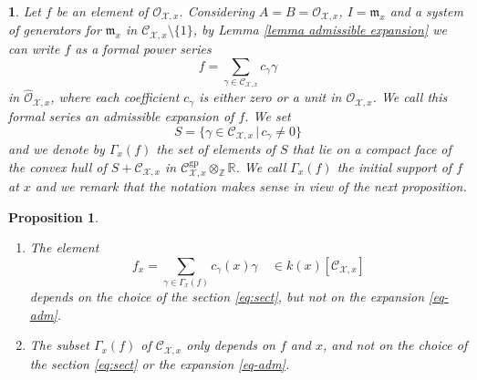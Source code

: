\documentclass{amsart}%
\numberwithin{equation}{subsection}
\theoremstyle{plain2}
\newtheorem{prop}[equation]{Proposition}
\theoremstyle{definition2}
\theoremstyle{stepstyle}
\theoremstyle{point}
\theoremstyle{subpoint}
\newtheorem{subpoint}[equation]{}%
\newcommand{\spa}[1]{\begin{subpoint}#1\end{subpoint}}           %
\newcommand{\Z}{\ensuremath{\mathbb{Z}}}
\newcommand{\R}{\ensuremath{\mathbb{R}}}
\newcommand{\cX}{\ensuremath{\mathscr{X}}}
\newcommand{\caC}{\ensuremath{\mathcal{C}}}
\newcommand{\caO}{\ensuremath{\mathcal{O}}}
\renewcommand{\R}{\ensuremath{\mathbb{R}}}
\newcommand{\gp}{\mathrm{gp}}
\begin{document}
\spa{ \label{paragr admissible expansion}Let $f$ be an element of $\mathcal{O}_{\cX,x}$. Considering $A=B=\caO_{\cX,x}$, $I=\mathfrak{m}_x$ and a system of generators for $\mathfrak{m}_x$ in $\caC_{\cX,x} \setminus \{1\}$, by Lemma \ref{lemma admissible expansion} we can write $f$ as a formal power series
\begin{equation}\label{eq-adm}
f=\sum_{\gamma \in \mathcal{C}_{\cX,x}}c_{\gamma}\gamma
\end{equation}
 in
$\widehat{\mathcal{O}}_{\cX,x}$, where each coefficient $c_\gamma$
 is either zero or a unit in $\mathcal{O}_{\cX,x}$. We call this formal series an \textit{admissible expansion} of $f$. We set
 \begin{equation}\label{equ def S}
S=\{\gamma\in\mathcal{C}_{\cX,x}\,|\,c_\gamma\neq 0\}
 \end{equation} and we denote by $\Gamma_x(f)$ the set of elements of $S$ that lie on a compact face of the convex hull of $S+ \mathcal{C}_{\cX,x}$ in $\mathcal{C}^{\gp}_{\cX,x}\otimes_{\Z}\R$. We call $\Gamma_x(f)$ the {\em initial support} of $f$ at $x$ and we remark that the notation  makes sense in view of the next proposition.}
\begin{prop}\label{prop-init}\item
\begin{enumerate}
\item \label{it:indep1} The element
$$f_x=\sum_{\gamma\in\Gamma_x(f)}c_\gamma(x) \gamma\quad \in k(x)[\mathcal{C}_{\cX,x}]$$ depends on the choice of the section \eqref{eq:sect}, but not on the expansion \eqref{eq-adm}. \item \label{it:indep2} The subset $\Gamma_x(f)$ of $\mathcal{C}_{\cX,x}$ only depends on $f$ and $x$, and not on the choice of the section \eqref{eq:sect} or the expansion \eqref{eq-adm}.
\end{enumerate}
\end{prop}
\end{document}

